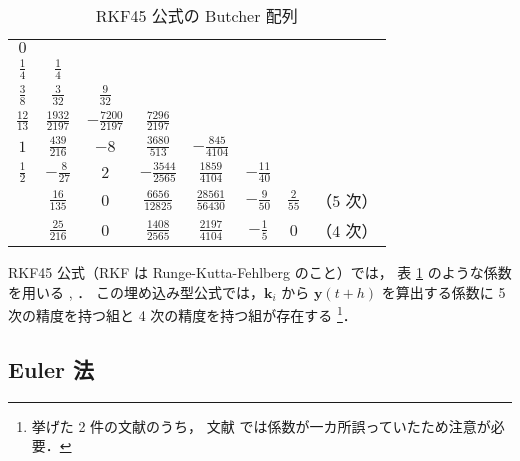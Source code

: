 \begin{table}[bp]
    \caption{RKF45 公式の Butcher 配列}
    \label{table:ode_runge-kutta_butcher-array-rkf45}
    \centering
    \begin{tabular}{c|ccccccc}
        $0$             &                     &                      &                      &                       &                  &                &       \\
        $\frac{1}{4}$   & $\frac{1}{4}$       &                      &                      &                       &                  &                &       \\
        $\frac{3}{8}$   & $\frac{3}{32}$      & $\frac{9}{32}$       &                      &                       &                  &                &       \\
        $\frac{12}{13}$ & $\frac{1932}{2197}$ & $-\frac{7200}{2197}$ & $\frac{7296}{2197}$  &                       &                  &                &       \\
        $1$             & $\frac{439}{216}$   & $-8$                 & $\frac{3680}{513}$   & $-\frac{845}{4104}$   &                  &                &       \\
        $\frac{1}{2}$   & $-\frac{8}{27}$     & $2$                  & $-\frac{3544}{2565}$ & $\frac{1859}{4104}$   & $-\frac{11}{40}$ &                &       \\
        \hline
                        & $\frac{16}{135}$    & $0$                  & $\frac{6656}{12825}$ & $\frac{28561}{56430}$ & $-\frac{9}{50}$  & $\frac{2}{55}$ & （5 次） \\
                        & $\frac{25}{216}$    & $0$                  & $\frac{1408}{2565}$  & $\frac{2197}{4104}$   & $-\frac{1}{5}$   & $0$            & （4 次）
    \end{tabular}
\end{table}

RKF45 公式（RKF は Runge-Kutta-Fehlberg のこと）では，
表 \ref{table:ode_runge-kutta_butcher-array-rkf45} のような係数を用いる
\cite[4.1 節 (a)]{Mitsui1993}, \cite[Section 9.5]{Mathews2004}．
この埋め込み型公式では，$\bm{k}_i$ から $\bm{y}(t + h)$ を算出する係数に
5 次の精度を持つ組と 4 次の精度を持つ組が存在する
\footnote{挙げた 2 件の文献のうち，%
    文献 \cite{Mitsui1993} では係数が一カ所誤っていたため注意が必要．}．

\subsection{Euler 法}\label{sec:ode_runge-kutta_explicit-euler}

